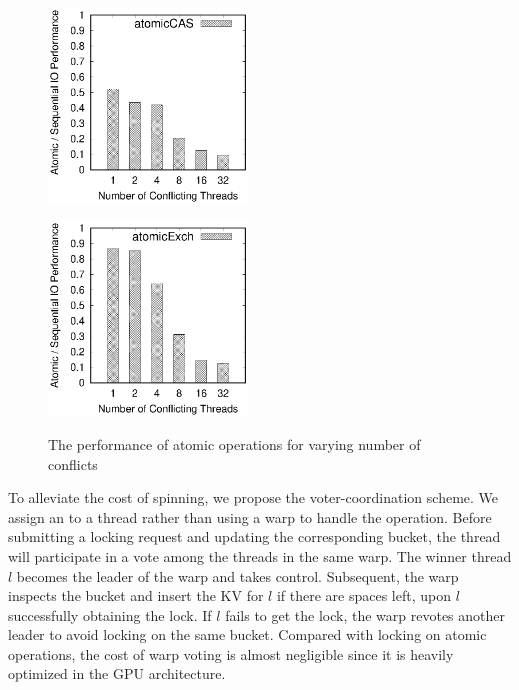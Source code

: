 \begin{figure}[t]
	\hspace{-3em}
	\begin{minipage}{0.5\linewidth}
		\label{fig:atomicCAS}
		\includegraphics[width=5.3cm]{exp/atomic/atomicCAS.eps}
	\end{minipage}
	\hspace{-1em}
	\begin{minipage}{0.5\linewidth}
		\label{fig:atomicExch}
		\includegraphics[width=5.3cm]{exp/atomic/atomicExch.eps}
	\end{minipage}
	\caption{The performance of atomic operations for varying number of conflicts}
	\label{fig:atomic}
\end{figure}

To alleviate the cost of spinning, we propose the voter-coordination scheme. 
We assign an  to a thread rather than using a warp to handle the operation. Before submitting a locking request and updating the corresponding bucket, the thread will participate in a vote among the threads in the same warp. 
The winner thread $l$ becomes the leader of the warp and takes control. Subsequent, the warp inspects the bucket and insert the KV for $l$ if there are spaces left, upon $l$ successfully obtaining the lock.
If $l$ fails to get the lock, the warp revotes another leader to avoid locking on the same bucket.
Compared with locking on atomic operations, the cost of warp voting is almost negligible since it is heavily optimized in the GPU architecture.  



